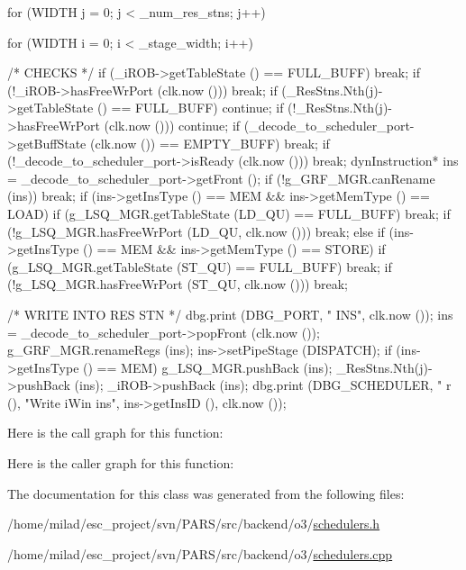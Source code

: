 \begin{DoxyCode}
                                               {
    for (WIDTH j = 0; j < _num_res_stns; j++) {
        for (WIDTH i = 0; i < _stage_width; i++) {
            /* CHECKS */
            if (_iROB->getTableState () == FULL_BUFF) break;
            if (!_iROB->hasFreeWrPort (clk.now ())) break;
            if (_ResStns.Nth(j)->getTableState () == FULL_BUFF) continue;
            if (!_ResStns.Nth(j)->hasFreeWrPort (clk.now ())) continue;
            if (_decode_to_scheduler_port->getBuffState (clk.now ()) == 
      EMPTY_BUFF) break;
            if (!_decode_to_scheduler_port->isReady (clk.now ())) break;
            dynInstruction* ins = _decode_to_scheduler_port->getFront ();
            if (!g_GRF_MGR.canRename (ins)) break;
            if (ins->getInsType () == MEM && ins->getMemType () == LOAD) {
                if (g_LSQ_MGR.getTableState (LD_QU) == FULL_BUFF) break;
                if (!g_LSQ_MGR.hasFreeWrPort (LD_QU, clk.now ())) break;
            } else if (ins->getInsType () == MEM && ins->getMemType () == STORE) 
      {
                if (g_LSQ_MGR.getTableState (ST_QU) == FULL_BUFF) break;
                if (!g_LSQ_MGR.hasFreeWrPort (ST_QU, clk.now ())) break;
            }

            /* WRITE INTO RES STN */
            dbg.print (DBG_PORT, "%
       INS", clk.now ());
            ins = _decode_to_scheduler_port->popFront (clk.now ());
            g_GRF_MGR.renameRegs (ins);
            ins->setPipeStage (DISPATCH);
            if (ins->getInsType () == MEM) g_LSQ_MGR.pushBack (ins);
            _ResStns.Nth(j)->pushBack (ins);
            _iROB->pushBack (ins);
            dbg.print (DBG_SCHEDULER, "%
      r (), "Write iWin ins", ins->getInsID (), clk.now ());
        }
    }
}
\end{DoxyCode}


Here is the call graph for this function:




Here is the caller graph for this function:




The documentation for this class was generated from the following files:\begin{DoxyCompactItemize}
\item 
/home/milad/esc\_\-project/svn/PARS/src/backend/o3/\hyperlink{o3_2schedulers_8h}{schedulers.h}\item 
/home/milad/esc\_\-project/svn/PARS/src/backend/o3/\hyperlink{o3_2schedulers_8cpp}{schedulers.cpp}\end{DoxyCompactItemize}
